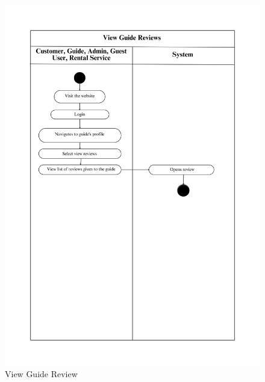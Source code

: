 \begin{figure}[h]
    \centering
    \includegraphics[width=1\textwidth]{Images/Activity Diagrams/30 View Guide Reviews.png}
    \caption{View Guide Review}
    \label{fig:activity-view-guide-review}
\end{figure}

